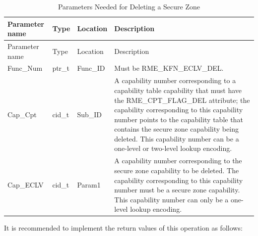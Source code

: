 \begin{xltabular}{\textwidth}{@{}>{\hsize\raggedright\arraybackslash}X>{\hsize\raggedright\arraybackslash}X>{\hsize\raggedright\arraybackslash}X>{\hsize\raggedright\arraybackslash}X@{}}
\caption{Parameters Needed for Deleting a Secure Zone}\label{tab:8-96-delete-enclave-parameters}\\
\toprule
Parameter name & Type & Location & Description\tabularnewline
\endfirsthead
\toprule
Parameter name & Type & Location & Description\tabularnewline
\midrule
\endhead
\bottomrule
\endlastfoot
Func\_Num & ptr\_t & Func\_ID &
Must be RME\_KFN\_ECLV\_DEL.\tabularnewline
Cap\_Cpt & cid\_t & Sub\_ID &
A capability number corresponding to a capability table capability that must have the RME\_CPT\_FLAG\_DEL attribute; the capability corresponding to this capability number points to the capability table that contains the secure zone capability being deleted. This capability number can be a one-level or two-level lookup encoding.\tabularnewline
Cap\_ECLV & cid\_t & Param1 &
A capability number corresponding to the secure zone capability to be deleted. The capability corresponding to this capability number must be a secure zone capability. This capability number can only be a one-level lookup encoding.\tabularnewline
\end{xltabular}
\nopagebreak[4]

It is recommended to implement the return values of this operation as follows:


